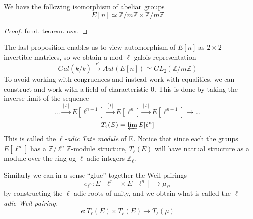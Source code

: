 \begin{prop}
We have the following isomorphism of abelian groups
 $$ E[n] \simeq \mathbb{Z}/m\mathbb{Z} \times \mathbb{Z}/m\mathbb{Z} $$
\end{prop}
\begin{proof}
 fund. teorem. osv.
\end{proof}

The last proposition enables us to view automorphism of $E[n]$ as $2\times 2$ invertible matrices,
so we obtain a  mod $\ell$ galois representation
$$ Gal(\bar{k}/k) \overset{\rho}{\rightarrow} Aut(E[n]) \simeq GL_2(\mathbb{Z}/m\mathbb{Z}) $$
To avoid working with congruences and instead work with equalities, we can construct
and work with a field of characteristic 0. This is done by taking the inverse limit of the sequence
$$ \dots \overset{[l]}{\rightarrow} E[\ell^{n+1}] \overset{[l]}{\rightarrow} E[\ell^{n}] \overset{[l]}{\rightarrow} E[\ell^{n-1}] \rightarrow \ldots $$
$$ T_\ell(E) = \varprojlim E[\ell^n] $$
This is called the \emph{$\ell$-adic Tate module} of E. Notice that since each the groups $E[\ell^n]$ has a
$\mathbb{Z}/\ell^n\mathbb{Z}$-module structure, $T_\ell(E)$ will have natrual structure as a module
over the ring og $\ell$-adic integers $\mathbb{Z}_\ell$.

Similarly we can in a sense ``glue'' together the Weil pairings
$$ e_{\ell^n} : E[\ell^n] \times E[\ell^n] \rightarrow \mu_{\ell^n} $$
by constructing the $\ell$-adic roots of unity, and we obtain what is called the
\emph{$\ell$-adic Weil pairing}.
$$ e: T_\ell(E) \times T_\ell(E) \rightarrow T_\ell(\mu) $$
